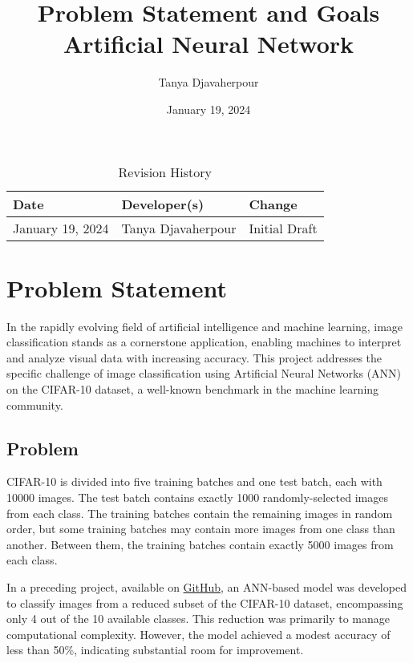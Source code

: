 \documentclass{article}
\title{Problem Statement and Goals\\Artificial Neural Network}
\author{Tanya Djavaherpour}
\date{January 19, 2024}
\begin{document}
\maketitle

\begin{table}[hp]
\caption{Revision History} \label{TblRevisionHistory}
\begin{tabularx}{\textwidth}{llX}
\toprule
\textbf{Date} & \textbf{Developer(s)} & \textbf{Change}\\
\midrule
January 19, 2024 & Tanya Djavaherpour & Initial Draft\\
\bottomrule
\end{tabularx}
\end{table}

\section{Problem Statement}

In the rapidly evolving field of artificial intelligence and machine learning, image classification 
stands as a cornerstone application, enabling machines to interpret and analyze visual data with 
increasing accuracy. This project addresses the specific challenge of image classification using 
Artificial Neural Networks (ANN) on the CIFAR-10 dataset, a well-known benchmark in the machine learning community.

\subsection{Problem}

CIFAR-10 is divided into five training batches and one test batch, 
each with 10000 images. The test batch contains exactly 1000 randomly-selected 
images from each class. The training batches contain the remaining images in random order, 
but some training batches may contain more images from one class than another. Between them, 
the training batches contain exactly 5000 images from each class.

In a preceding project, available on \href{https://github.com/tanya-jp/CIFAR-Classification/tree/main}{GitHub}, an ANN-based model was developed to classify images 
from a reduced subset of the CIFAR-10 dataset, encompassing only 4 out of the 10 available classes. 
This reduction was primarily to manage computational complexity. However, the model achieved a modest 
accuracy of less than 50\%, indicating substantial room for improvement.
\end{document}
